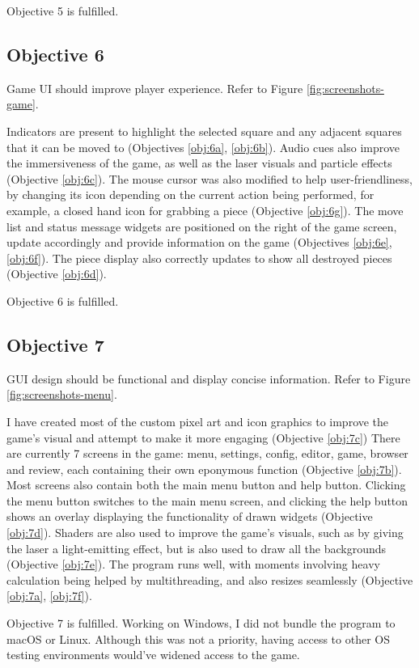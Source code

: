 \documentclass[../main/main.tex]{subfiles}
\begin{document}
Objective 5 is fulfilled.

\subsection{Objective 6}
Game UI should improve player experience. Refer to Figure \ref{fig:screenshots-game}.

Indicators are present to highlight the selected square and any adjacent squares that it can be moved to (Objectives \ref{obj:6a}, \ref{obj:6b}). Audio cues also improve the immersiveness of the game, as well as the laser visuals and particle effects (Objective \ref{obj:6c}). The mouse cursor was also modified to help user-friendliness, by changing its icon depending on the current action being performed, for example, a closed hand icon for grabbing a piece (Objective \ref{obj:6g}). The move list and status message widgets are positioned on the right of the game screen, update accordingly and provide information on the game (Objectives \ref{obj:6e}, \ref{obj:6f}). The piece display also correctly updates to show all destroyed pieces (Objective \ref{obj:6d}).

Objective 6 is fulfilled.

\subsection{Objective 7}
GUI design should be functional and display concise information. Refer to Figure \ref{fig:screenshots-menu}.

I have created most of the custom pixel art and icon graphics to improve the game's visual and attempt to make it more engaging (Objective \ref{obj:7c}) There are currently 7 screens in the game: menu, settings, config, editor, game, browser and review, each containing their own eponymous function (Objective \ref{obj:7b}). Most screens also contain both the main menu button and help button. Clicking the menu button switches to the main menu screen, and clicking the help button shows an overlay displaying the functionality of drawn widgets (Objective \ref{obj:7d}). Shaders are also used to improve the game's visuals, such as by giving the laser a light-emitting effect, but is also used to draw all the backgrounds (Objective \ref{obj:7e}). The program runs well, with moments involving heavy calculation being helped by multithreading, and also resizes seamlessly (Objective \ref{obj:7a}, \ref{obj:7f}).

Objective 7 is fulfilled. Working on Windows, I did not bundle the program to macOS or Linux. Although this was not a priority, having access to other OS testing environments would've widened access to the game.
\end{document}
